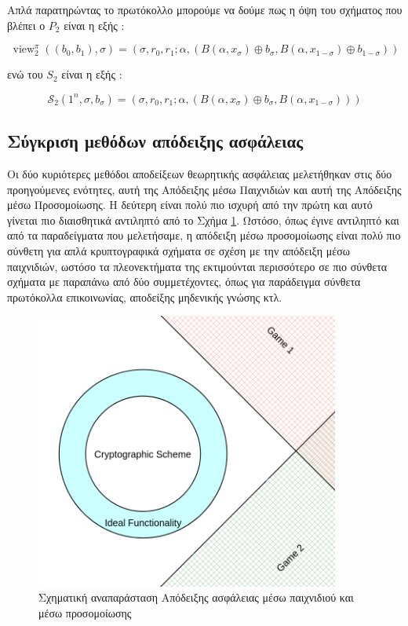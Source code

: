 Απλά παρατηρώντας το πρωτόκολλο μπορούμε να δούμε πως η όψη του σχήματος που βλέπει ο $P_2$ είναι η εξής :

$$
\operatorname{view}_{2}^{\pi}\left(\left(b_{0}, b_{1}\right), \sigma\right)=\left(\sigma, r_{0}, r_{1} ; \alpha,\left(B\left(\alpha, x_{\sigma}\right) \oplus b_{\sigma}, B\left(\alpha, x_{1-\sigma}\right) \oplus b_{1-\sigma}\right)\right)
$$

ενώ του $S_2$ είναι η εξής :

$$
\mathcal{S}_{2}\left(1^{n}, \sigma, b_{\sigma}\right)=\left(\sigma, r_{0}, r_{1} ; \alpha,\left(B\left(\alpha, x_{
\sigma
}\right) \oplus b_{\sigma}, B\left(\alpha, x_{1-\sigma}\right)\right)\right)
$$

\subsection{Σύγκριση μεθόδων απόδειξης ασφάλειας}

Οι δύο κυριότερες μεθόδοι αποδείξεων θεωρητικής ασφάλειας μελετήθηκαν στις δύο προηγούμενες ενότητες, αυτή της Απόδειξης μέσω Παιχνιδιών και αυτή της Απόδειξης μέσω Προσομοίωσης. Η δεύτερη είναι πολύ πιο ισχυρή από την πρώτη και αυτό γίνεται πιο διαισθητικά αντιληπτό από το Σχήμα \ref{fig:game_proof_vs_simulation_proof}. Ωστόσο, όπως έγινε αντιληπτό και από τα παραδείγματα που μελετήσαμε, η απόδειξη μέσω προσομοίωσης είναι πολύ πιο σύνθετη για απλά κρυπτογραφικά σχήματα σε σχέση με την απόδειξη μέσω παιχνιδιών, ωστόσο τα πλεονεκτήματα της εκτιμούνται περισσότερο σε πιο σύνθετα σχήματα με παραπάνω από δύο συμμετέχοντες, όπως για παράδειγμα σύνθετα πρωτόκολλα επικοινωνίας, αποδείξης μηδενικής γνώσης κτλ.

\cite{cryptoeprint:2000/067}

\begin{figure}[t]
\includegraphics[width=10cm]{./01_body/images/simulation_vs_game_based_security.png}
\centering
\caption{Σχηματική αναπαράσταση Απόδειξης ασφάλειας μέσω παιχνιδιού και μέσω προσομοίωσης}
\label{fig:game_proof_vs_simulation_proof}
\end{figure}

